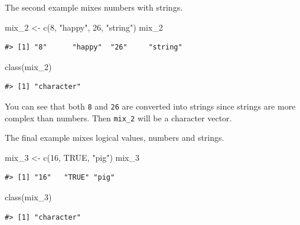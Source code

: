\documentclass[
]{book}
\newenvironment{Shaded}{\begin{snugshade}}{\end{snugshade}}
\newcommand{\ConstantTok}[1]{\textcolor[rgb]{0.00,0.00,0.00}{#1}}
\newcommand{\DecValTok}[1]{\textcolor[rgb]{0.00,0.00,0.81}{#1}}
\newcommand{\FunctionTok}[1]{\textcolor[rgb]{0.00,0.00,0.00}{#1}}
\newcommand{\NormalTok}[1]{#1}
\newcommand{\OtherTok}[1]{\textcolor[rgb]{0.56,0.35,0.01}{#1}}
\newcommand{\StringTok}[1]{\textcolor[rgb]{0.31,0.60,0.02}{#1}}
\begin{document}
The second example mixes numbers with strings.

\begin{Shaded}
\begin{Highlighting}[]
\NormalTok{mix\_2 }\OtherTok{\textless{}{-}} \FunctionTok{c}\NormalTok{(}\DecValTok{8}\NormalTok{, }\StringTok{"happy"}\NormalTok{, }\DecValTok{26}\NormalTok{, }\StringTok{"string"}\NormalTok{)}
\NormalTok{mix\_2 }
\end{Highlighting}
\end{Shaded}

\begin{verbatim}
#> [1] "8"      "happy"  "26"     "string"
\end{verbatim}

\begin{Shaded}
\begin{Highlighting}[]
\FunctionTok{class}\NormalTok{(mix\_2)}
\end{Highlighting}
\end{Shaded}

\begin{verbatim}
#> [1] "character"
\end{verbatim}

You can see that both \texttt{8} and \texttt{26} are converted into strings since strings are more complex than numbers. Then \texttt{mix\_2} will be a character vector.

The final example mixes logical values, numbers and strings.

\begin{Shaded}
\begin{Highlighting}[]
\NormalTok{mix\_3 }\OtherTok{\textless{}{-}} \FunctionTok{c}\NormalTok{(}\DecValTok{16}\NormalTok{, }\ConstantTok{TRUE}\NormalTok{, }\StringTok{"pig"}\NormalTok{)}
\NormalTok{mix\_3}
\end{Highlighting}
\end{Shaded}

\begin{verbatim}
#> [1] "16"   "TRUE" "pig"
\end{verbatim}

\begin{Shaded}
\begin{Highlighting}[]
\FunctionTok{class}\NormalTok{(mix\_3)}
\end{Highlighting}
\end{Shaded}

\begin{verbatim}
#> [1] "character"
\end{verbatim}
\end{document}
